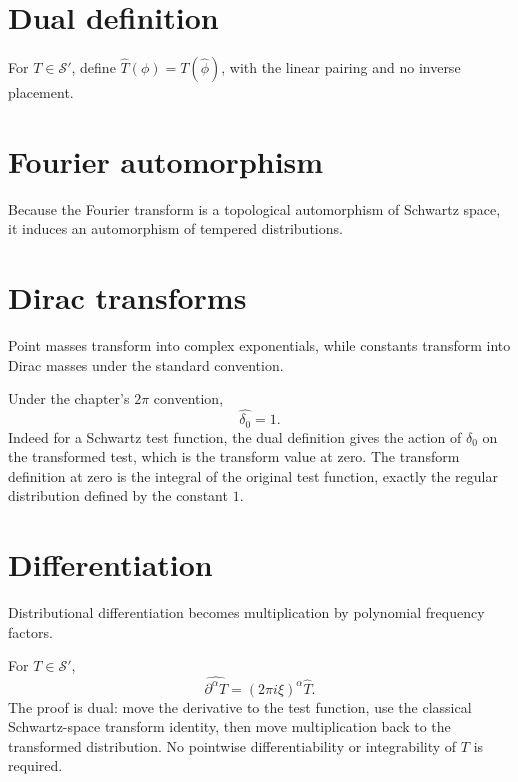 \section{Dual definition}
For $T\in\mathcal S'$, define $\widehat T(\phi)=T(\widehat\phi)$, with the linear pairing and no inverse placement.

\section{Fourier automorphism}
Because the Fourier transform is a topological automorphism of Schwartz space, it induces an automorphism of tempered distributions.

\section{Dirac transforms}
Point masses transform into complex exponentials, while constants transform into Dirac masses under the standard convention.


\begin{example}\label{ex:iii19-expand-01}
Under the chapter's \(2\pi\) convention,
\[
\widehat{\delta_0}=1.
\]
Indeed for a Schwartz test function, the dual definition gives the action of
\(\delta_0\) on the transformed test, which is the transform value at zero.
The transform definition at zero is the integral of the original test
function, exactly the regular distribution defined by the constant \(1\).
\end{example}
\section{Differentiation}
Distributional differentiation becomes multiplication by polynomial frequency factors.


\begin{example}\label{ex:iii19-expand-02}
For \(T\in\mathcal S'\),
\[
\widehat{\partial^\alpha T}
=(2\pi i\xi)^\alpha\widehat T.
\]
The proof is dual: move the derivative to the test function, use the classical
Schwartz-space transform identity, then move multiplication back to the
transformed distribution. No pointwise differentiability or integrability of
\(T\) is required.
\end{example}
